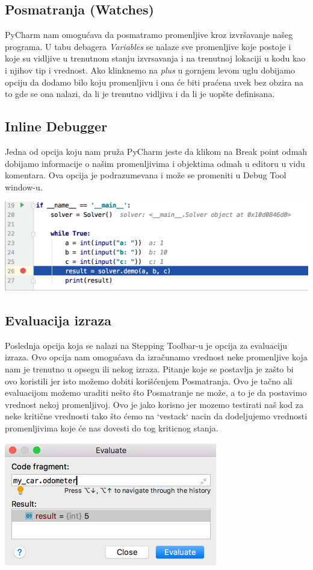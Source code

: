 \documentclass[a4paper]{article}
\begin{document}
\subsection{Posmatranja (Watches)}
PyCharm nam omogućava da posmatramo promenljive kroz izvršavanje našeg programa. U tabu debagera \emph{Variables} se nalaze sve promenljive koje postoje i koje su vidljive u trenutnom stanju izvrsavanja i na trenutnoj lokaciji u kodu kao i njihov tip i vrednost. Ako klinknemo na \emph {plus} u gornjem levom uglu dobijamo opciju da dodamo bilo koju promenljivu i ona će biti praćena uvek bez obzira na to gde se ona nalazi, da li je trenutno vidljiva i da li je uopšte definisana.
\subsection{Inline Debugger}
Jedna od opcija koju nam pruža PyCharm jeste da klikom na Break point odmah dobijamo informacije o našim promenljivima i objektima odmah u editoru u vidu komentara. Ova opcija je podrazumevana i može se promeniti u Debug Tool window-u.


\includegraphics[scale = 0.4]{3}
\subsection{Evaluacija izraza}
Poslednja opcija koja se nalazi na Stepping Toolbar-u je opcija za evaluaciju izraza. Ovo opcija nam omogućava da izračunamo vrednost neke promenljive koja nam je trenutno u opsegu ili nekog izraza. Pitanje koje se postavlja je zašto bi ovo koristili jer isto možemo dobiti korišćenjem Posmatranja. Ovo je tačno ali evaluacijom možemo uraditi nešto što Posmatranje ne može, a to je da postavimo vrednost nekoj promenljivoj. Ovo je jako korisno jer mozemo testirati naš kod za neke kritične vrednosti tako što ćemo na `vestack` nacin da dodeljujemo vrednosti promenljivima koje će nas dovesti do tog kriticnog stanja.

\includegraphics[scale = 0.4]{4}
\end{document}
